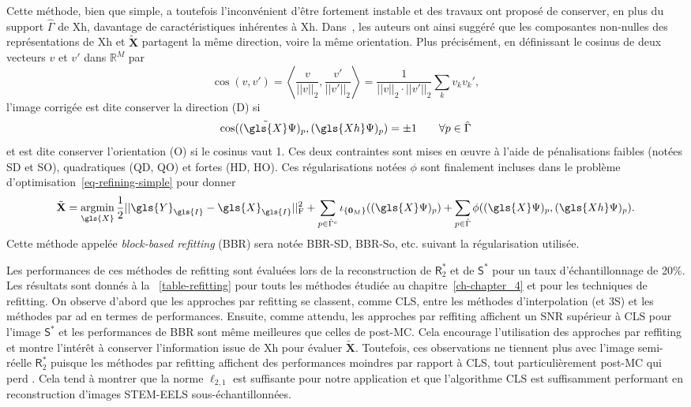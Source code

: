 Cette méthode, bien que simple, a toutefois l'inconvénient d'être fortement instable et des travaux ont proposé de conserver, en plus du support $\hat{\Gamma}$ de \gls{Xh}, davantage de caractéristiques inhérentes à \gls{Xh}. Dans~\cite{deledalle2019block}, les auteurs ont ainsi suggéré que les composantes non-nulles des représentations de \gls{Xh} et $\tilde{\mathbf{X}}$ partagent la même direction, voire la même orientation. Plus précisément, en définissant le cosinus de deux vecteurs $v$ et $v'$ dans $\mathbb{R}^M$ par
\begin{equation}
    \cos(v, v') = \left< \frac{v}{||v||_2} , \frac{v'}{||v'||_2} \right> = \frac{1}{||v||_2\cdot||v'||_2}\sum_k v_kv_k',
\end{equation}
l'image corrigée est dite conserver la direction (D) si 
\begin{equation}
    \cos( (\tilde{\gls{X}}\Psi)_p , (\gls{Xh}\Psi)_p ) = \pm 1 \qquad \forall p\in\hat{\Gamma}
\end{equation}
et est dite conserver l'orientation (O) si le cosinus vaut 1. Ces deux contraintes sont mises en \oe{}uvre à l'aide de pénalisations faibles (notées SD et SO), quadratiques (QD, QO) et fortes (HD, HO). Ces régularisations notées $\phi$ sont finalement incluses dans le problème d'optimisation~\ref{eq-refining-simple} pour donner
\begin{equation}
\tilde{\mathbf{X}} = \argmin_{\gls{X}} 
%
\frac{1}{2}\frobnorm{\gls{Y}_{\gls{I}} - \gls{X}_{\gls{I}}} + 
%
\sum_{p\in\hat{\Gamma}^c} \iota_{\{\mathbf{0}_M\}}((\gls{X}\Psi)_p) +
%
\sum_{p\in\hat{\Gamma}} \phi( (\gls{X}\Psi)_p , (\gls{Xh}\Psi)_p ).
\end{equation}
Cette méthode appelée \emph{block-based refitting} (BBR) sera notée BBR-SD, BBR-So, etc. suivant la régularisation utilisée.

Les performances de ces méthodes de refitting sont évaluées lors de la reconstruction de $\mathsf{R}_2^*$ et de $\mathsf{S}^*$ pour un taux d'échantillonnage de 20\%. Les résultats sont donnés à la \tabname~\ref{table-refitting} pour touts les méthodes étudiée au chapitre~\ref{ch-chapter_4} et pour les techniques de refitting.
%
On observe d'abord que les approches par refitting se classent, comme CLS, entre les méthodes d'interpolation (et 3S) et les méthodes par \gls{ad} en termes de performances. 
%
Ensuite, comme attendu, les approches par reffiting affichent un SNR supérieur à CLS pour l'image $\mathsf{S}^*$ et les performances de BBR sont même meilleures que celles de post-MC.
%
Cela encourage l'utilisation des approches par reffiting et montre l'intérêt à conserver l'information issue de \gls{Xh} pour évaluer $\tilde{\mathbf{X}}$. 
%
Toutefois, ces observations ne tiennent plus avec l'image semi-réelle $\mathsf{R}_2^*$ puisque les méthodes par refitting affichent des performances moindres par rapport à CLS, tout particulièrement post-MC qui perd . 
%
Cela tend à montrer que la norme $\ell_{2, 1}$ est suffisante pour notre application et que l'algorithme CLS est suffisamment performant en reconstruction d'images STEM-EELS sous-échantillonnées.


